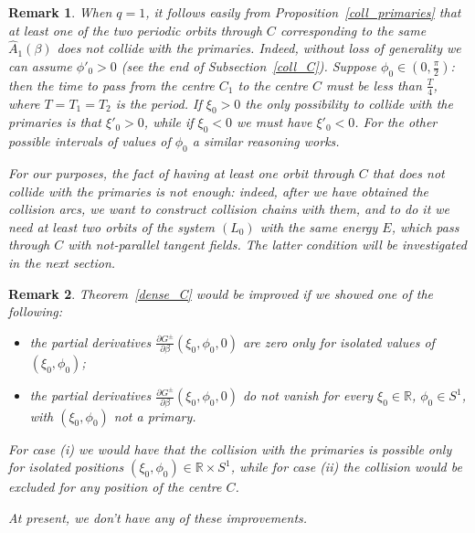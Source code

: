 \documentclass[a4paper]{article}
\newtheorem{remark}{Remark}
\begin{document}
 
\begin{remark}
When $q=1$, it follows easily from Proposition~\ref{coll_primaries}
that at least one of the two periodic orbits through $C$ corresponding
to the same $\hat{A}_1(\beta)$ does not collide with the primaries.
Indeed, without loss of generality we can assume $\phi'_0>0$ (see the
end of Subsection~\ref{coll_C}).  Suppose $\phi_0 \in
(0,\frac{\pi}{2})$: then the time to pass from the centre $C_1$ to the
centre $C$ must be less than $\frac{T}{4}$, where $T=T_1=T_2$ is the
period. If $\xi_0>0$ the only possibility to collide with the
primaries is that $\xi'_0>0$, while if $\xi_0<0$ we must have
$\xi'_0<0$.  For the other possible intervals of values of $\phi_0$ a
similar reasoning works.

For our purposes, the fact of having at least one orbit through $C$
that does not collide with the primaries is not enough: indeed, after
we have obtained the collision arcs, we want to construct
\emph{collision chains} with them, and to do it we need at least two
orbits of the system $(L_0)$ with the same energy $E$, which pass
through $C$ with not-parallel tangent fields.  The latter condition
will be investigated in the next section.
\end{remark}

\begin{remark}
Theorem~\ref{dense_C} would be improved if we showed one of the
following:
\begin{itemize}
\item[i)] the partial derivatives $\frac{\partial G^{\pm}}{\partial
  \beta}(\xi_0,\phi_0,0)$ are zero only for isolated values of
  $(\xi_0,\phi_0)$;
\item[ii)] the partial derivatives $\frac{\partial G^{\pm}}{\partial
  \beta}(\xi_0,\phi_0,0)$ do not vanish for every $\xi_0 \in {\mathbb{R}}$,
  $\phi_0 \in S^1$, with $(\xi_0,\phi_0)$ not a primary.
\end{itemize}
For case (i) we would have that the collision with the primaries is
possible only for isolated positions $(\xi_0,\phi_0)\in {\mathbb{R}} \times
S^1$, while for case (ii) the collision would be excluded for any
position of the centre $C$.

At present, we don't have any of these improvements.
\end{remark}
\end{document}
